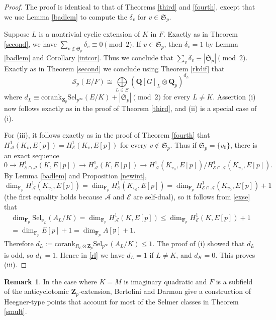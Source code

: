 \documentclass[reqno]{amsart}
\theoremstyle{definition}
\newtheorem{rem}[thm]{Remark}
\def\Z{\mathbf{Z}}
\def\Q{\mathbf{Q}}
\def\F{\mathbf{F}}
\def\Zp{\Z_p}
\def\Qp{\Q_p}
\def\Fp{\F_p}
\def\A{\mathcal{A}}
\def\E{\mathcal{E}}
\def\cS{\mathcal{S}}
\def\P{\mathfrak{p}}
\def\cork{\mathrm{corank}}
\def\Sel{\mathrm{Sel}}
\def\Scp{\cS_p}
\def\Hs#1{H^1_{#1}}
\def\HE{\Hs{\E}}
\def\HA{\Hs{\A}}
\def\dirsum#1{\underset{#1}{\textstyle\bigoplus}}
\def\Sbad{\mathfrak{S}}
\begin{document}
\begin{proof}
The proof is identical to that of Theorems \ref{third} and \ref{fourth}, except that we 
use Lemma \ref{badlem} to compute the $\delta_v$ for $v \in \Sbad_p$.

Suppose $L$ is a nontrivial cyclic extension of $K$ in $F$.  
Exactly as in Theorem \ref{second}, we have 
$\sum_{v \notin \Sbad_p} \delta_v \equiv 0 \pmod{2}$.
If $v \in \Sbad_p$, then $\delta_v = 1$ by Lemma \ref{badlem} and 
Corollary \ref{intcor}.  Thus we conclude that 
$\sum_v \delta_v \equiv |\Sbad_p| \pmod{2}$.
Exactly as in Theorem \ref{second} we conclude using Theorem \ref{rkdif} that 
\begin{equation}
\label{rl}
\Scp(E/F) \cong \dirsum{L \in \Xi} (\Q[G]_L \otimes \Qp)^{d_L}
\end{equation}
where $d_L \equiv \cork_{\Zp}\Sel_{p^\infty}(E/K) + |\Sbad_p| \pmod{2}$ 
for every $L \ne K$.  
Assertion (i) now follows 
exactly as in the proof of Theorem \ref{third}, and (ii) is a special case of (i).

For (iii), it follows exactly as in the proof of Theorem \ref{fourth} that 
$\HA(K_v,E[p]) = \HE(K_v,E[p])$ for every $v \notin \Sbad_p$.  
Thus if $\Sbad_p = \{v_0\}$, there is an exact sequence
\begin{equation}
\label{exse}
0 \to \Hs{\E\cap\A}(K,E[p]) \to \HA(K,E[p]) 
    \to \HA(K_{v_0},E[p])/\Hs{\E\cap\A}(K_{v_0},E[p]).
\end{equation}
By Lemma \ref{badlem} and Proposition \ref{newint},
$$
\dim_{\Fp}\HA(K_{v_0},E[p]) = \dim_{\Fp}\HE(K_{v_0},E[p]) 
    = \dim_{\Fp}\Hs{\E\cap\A}(K_{v_0},E[p]) + 1
$$
(the first equality holds because $\A$ and $\E$ are self-dual), 
so it follows from \eqref{exse} that 
\begin{multline*}
\dim_{\Fp} \Sel_{\P_L}(A_L/K) = \dim_{\Fp}\HA(K,E[p]) 
    \le \dim_{\Fp}\HE(K,E[p]) + 1 \\
    = \dim_{\Fp}E[p] + 1 = \dim_{\Fp}A[\P] + 1.
\end{multline*}
Therefore $d_L := \cork_{R_L \otimes \Zp}\Sel_{p^\infty}(A_L/K) \le 1$.  
The proof of (i) showed that $d_L$ is odd, so $d_L = 1$.  
Hence in \eqref{rl} we have $d_L = 1$ if $L \ne K$, and $d_K = 0$.  This proves (iii).
\end{proof}

\begin{rem}
In the case where $K = M$ is imaginary quadratic and $F$ is 
a subfield of the anticyclotomic $\Zp$-extension, Bertolini and Darmon 
\cite{bd} give a construction of Heegner-type points that account for 
most of the Selmer classes in Theorem \ref{smult}.
\end{rem}
\end{document}
